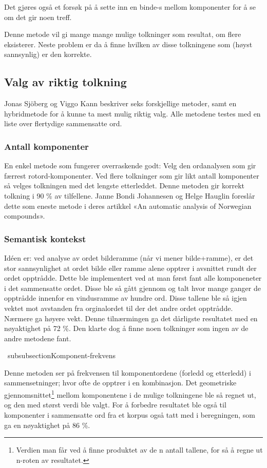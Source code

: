 Det gjøres også et forsøk på å sette inn en binde-s mellom komponenter for å se om det gir noen treff. 

Denne metode vil gi mange mange mulige tolkninger som resultat, om flere eksisterer. Neste problem er da å finne hvilken av disse tolkningene som (høyst sannsynlig) er den korrekte.

\subsection{Valg av riktig tolkning}
\label{sec:sjoberg}

Jonas Sjöberg og Viggo Kann beskriver seks forskjellige metoder, samt en hybridmetode for å kunne ta mest mulig riktig valg. Alle metodene testes med en liste over flertydige sammensatte ord.

\subsubsection{Antall komponenter}

En enkel metode som fungerer overraskende godt: Velg den ordanalysen som gir færrest rotord-komponenter. Ved flere tolkninger som gir likt antall komponenter så velges tolkningen med det lengste etterleddet. Denne metoden gir korrekt tolkning i 90 \% av tilfellene. Janne Bondi Johannesen og Helge Hauglin foreslår dette som eneste metode i deres artikkel «An automatic analysis of Norwegian compounds»\cite{johannessen1996automatic}. 

\subsubsection{Semantisk kontekst}

Idéen er: ved analyse av ordet bilderamme (når vi mener bilde+ramme), er det stor sannsynlighet at ordet bilde eller ramme alene opptrer i avsnittet rundt der ordet opptrådde. Dette ble implementert ved at man først fant alle komponeneter i det sammensatte ordet. Disse ble så gått gjennom og talt hvor mange ganger de opptrådde innenfor en vindusramme av hundre ord. Disse tallene ble så igjen vektet mot avstanden fra orginalordet til der det andre ordet opptrådde. Nærmere ga høyere vekt. Denne tilnærmingen ga det dårligste resultatet med en nøyaktighet på 72 \%. Den klarte dog å finne noen tolkninger som ingen av de andre metodene fant.

\ subsubsection{Komponent-frekvens}

Denne metoden ser på frekvensen til komponentordene (forledd og etterledd) i sammensetninger; hvor ofte de opptrer i en kombinasjon. Det geometriske gjennomsnittet\footnote{Verdien man får ved å finne produktet av de n antall tallene, for så å regne ut n-roten av resultatet.} mellom komponentene i de mulige tolkningene ble så regnet ut, og den med størst verdi ble valgt. For å forbedre resultatet ble også til komponenter i sammensatte ord fra et korpus også tatt med i beregningen, som ga en nøyaktighet på 86 \%.

